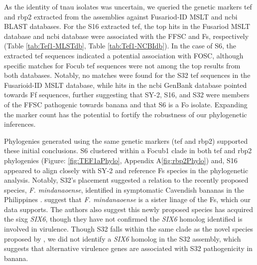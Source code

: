 As the identity of \ac{tnau} isolates was uncertain, we queried the genetic markers \acf{tef} and \acf{rbp2} extracted from the assemblies against Fusariod-ID MSLT and \ac{ncbi} BLAST databases. For the S16 extracted \ac{tef}, the top hits in the Fusariod MSLT database and \ac{ncbi} database were associated with the \ac{FFSC} and \ac{Fs}, respectively (Table \ref{tab:Tef1-MLSTdb}, Table \ref{tab:Tef1-NCBIdb}). In the case of S6, the extracted \ac{tef} sequences indicated a potential association with \ac{FOSC}, although specific matches for \ac{Focub} \ac{tef} sequences were not among the top results from both databases. Notably, no matches were found for the S32 \ac{tef} sequences in the Fusarioid-ID MSLT database, while hits in the \ac{ncbi} GenBank database pointed towards \ac{Ff} sequences, further suggesting that SY-2, S16, and S32 were members of the \ac{FFSC} pathogenic towards banana and that S6 is a \ac{Fo} isolate. Expanding the marker count has the potential to fortify the robustness of our phylogenetic inferences. 

Phylogenies generated using the same genetic markers (\ac{tef} and \ac{rbp2}) supported these initial conclusions. S6 clustered within a \ac{Focub1} clade in both \acs{tef} and \ac{rbp2} phylogenies (Figure: \ref{fig:TEF1aPhylo}, Appendix A\ref{fig:rbp2Phylo}) and, S16 appeared to align closely with SY-2 and reference \ac{Fs} species in the phylogenetic analysis. Notably, S32's placement suggested a relation to the recently proposed species, \textit{F. mindanaoense}, identified in symptomatic Cavendish bananas in the Philippines \parencite{Nozawa2023}. \textcite{Nozawa2023} suggest that \textit{F. mindanaoense} is a sister linage of the \ac{Fs}, which our data supports. The authors also suggest this newly proposed species has acquired the \ac{sixg} \textit{SIX6}, though they have not confirmed the \textit{SIX6} homolog identified is involved in virulence. Though S32 falls within the same clade as the novel species proposed by \textcite{Nozawa2023}, we did not identify a \textit{SIX6} homolog in the S32 assembly, which suggests that alternative virulence genes are associated with S32 pathogenicity in banana. 

